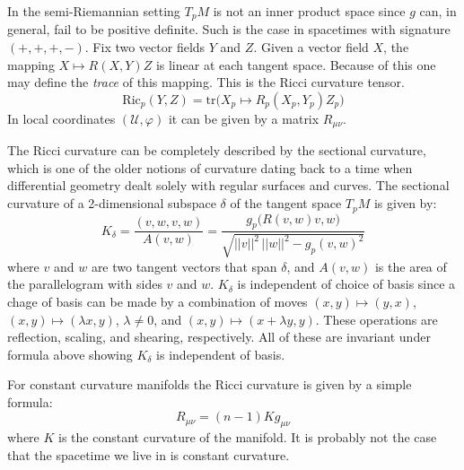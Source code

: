 \documentclass{beamer}
\begin{document}
    \begin{frame}
        In the semi-Riemannian setting $T_{p}M$ is not an inner product space
        since $g$ can, in general, fail to be positive definite. Such is the
        case in spacetimes with signature $(+,+,+,-)$. Fix two vector fields
        $Y$ and $Z$. Given a vector field $X$, the mapping
        $X\mapsto{R}(X,Y)Z$ is linear at each tangent space. Because of this
        one may define the \textit{trace} of this mapping. This is the Ricci
        curvature tensor.
        \begin{equation}
            \textrm{Ric}_{p}(Y,Z)=\textrm{tr}
                \big(X_{p}\mapsto{R}_{p}(X_{p},Y_{p})Z_{p}\big)
        \end{equation}
        In local coordinates $(\mathcal{U},\varphi)$ it can be given by a
        matrix $R_{\mu\nu}$.
    \end{frame}
    \begin{frame}
        The Ricci curvature can be completely described by the sectional
        curvature, which is one of the older notions of curvature dating back
        to a time when differential geometry dealt solely with regular surfaces
        and curves. The sectional curvature of a 2-dimensional subspace
        $\delta$ of the tangent space $T_{p}M$ is given by:
        \begin{equation}
            K_{\delta}=\frac{(v,w,v,w)}{A(v,w)}
                =\frac{g_{p}\big(R(v,w)v,w\big)}{\sqrt{||v||^{2}\,||w||^{2}-g_{p}(v,w)^{2}}}
        \end{equation}
        where $v$ and $w$ are two tangent vectors that span $\delta$, and
        $A(v,w)$ is the area of the parallelogram with sides $v$ and $w$.
        $K_{\delta}$ is independent of choice of basis since a chage of basis
        can be made by a combination of moves
        $(x,y)\mapsto(y,x)$, $(x,y)\mapsto(\lambda{x},y)$, $\lambda\ne{0}$, and
        $(x,y)\mapsto(x+\lambda{y},y)$. These operations are reflection,
        scaling, and shearing, respectively. All of these are invariant under
        formula above showing $K_{\delta}$ is independent of basis.
    \end{frame}
    \begin{frame}
        For constant curvature manifolds the Ricci curvature is given by a
        simple formula:
        \begin{equation}
            R_{\mu\nu}=(n-1)Kg_{\mu\nu}
        \end{equation}
        where $K$ is the constant curvature of the manifold.
        It is probably not the case that the spacetime we live in is constant
        curvature.
    \end{frame}
\end{document}

